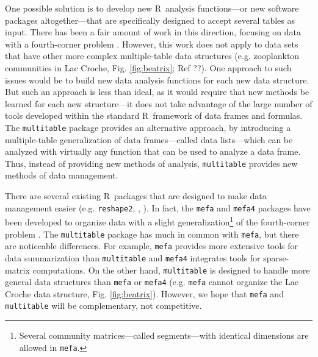 \documentclass{article}
\newcommand{\R}{{\sf R}}
\newcommand{\code}[1]{\texttt{#1}}
\numberwithin{exercise}{section}
\begin{document}
One possible solution is to develop new \R\ analysis functions---or new software packages altogether---that are specifically designed to accept several tables as input.  There has been a fair amount of work in this direction, focusing on data with a fourth-corner problem \citep{DoledecEtAl1996,LegendreEtAl1997,DrayAndLegendre2008,PillarEtAl2010,LeiboldEtAl2010,IvesAndHelmus2011}.  However, this work does not apply to data sets that have other more complex multiple-table data structures (e.g. zooplankton communities in Lac Croche, Fig. \ref{fig:beatrix}; Ref ??).  One approach to such issues would be to build new data analysis functions for each new data structure.  But such an approach is less than ideal, as it would require that new methods be learned for each new structure---it does not take advantage of the large number of tools developed within the standard \R\ framework of data frames and formulas.  The \code{multitable} package provides an alternative approach, by introducing a multiple-table generalization of data frames---called data lists---which can be analyzed with virtually any function that can be used to analyze a data frame.  Thus, instead of providing new methods of analysis, \code{multitable} provides new methods of data management.

There are several existing \R\ packages that are designed to make data management easier (e.g. \code{reshape2}; \citeauthor{Wickham2007}, \citeyear{Wickham2007}).  In fact, the \code{mefa} and \code{mefa4} packages have been developed to organize data with a slight generalization\footnote{Several community matrices---called segments---with identical dimensions are allowed in \code{mefa}.} of the fourth-corner problem \citep{Solymos2009}.  The \code{multitable} package has much in common with \code{mefa}, but there are noticeable differences.  For example, \code{mefa} provides more extensive tools for data summarization than \code{multitable} and \code{mefa4} integrates tools for sparse-matrix computations.  On the other hand, \code{multitable} is designed to handle more general data structures than \code{mefa} or \code{mefa4} (e.g. \code{mefa} cannot organize the Lac Croche data structure, Fig. \ref{fig:beatrix}).  However, we hope that \code{mefa} and \code{multitable} will be complementary, not competitive.
\end{document}

